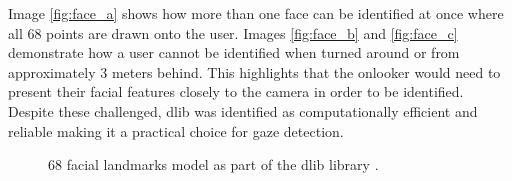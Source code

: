 \documentclass[12pt]{article}
\theoremstyle{plain}
\theoremstyle{definition}
\begin{document}
Image \ref{fig:face_a} shows how more than one face can be identified at once where all 68 points are drawn onto the user. Images \ref{fig:face_b} and \ref{fig:face_c} demonstrate how a user cannot be identified when turned around or from approximately 3 meters behind. This highlights that the onlooker would need to present their facial features closely to the camera in order to be identified. Despite these challenged, dlib was identified as computationally efficient and reliable making it a practical choice for gaze detection.


\begin{figure}[h!]
\centering
{}

\caption{68 facial landmarks model as part of the dlib library \cite{noauthor_dlib_nodate}. }
\label{fig:facial-landmarks}
\end{figure}
\end{document}
